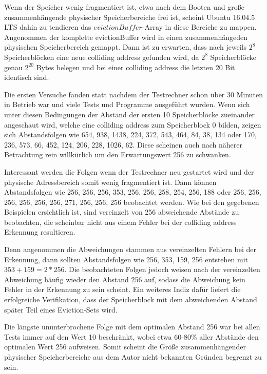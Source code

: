 Wenn der Speicher wenig fragmentiert ist, etwa nach dem Booten und große zusammenhängende physischer Speicherbereiche frei ist, scheint Ubuntu 16.04.5 LTS dahin zu tendieren das $evictionBuffer$-Array in diese Bereiche zu mappen.
Angenommen der komplette evictionBuffer wird in einen zusammenhängeden physischen Speicherbereich gemappt. Dann ist zu erwarten, dass nach jeweils $2^8$ Speicherblöcken eine neue colliding address gefunden wird, da $2^8$ Speicherblöcke genau $2^20$ Bytes belegen und bei einer colliding address die letzten 20 Bit identisch sind.

Die ersten Versuche fanden statt nachdem der Testrechner schon über 30 Minuten in Betrieb war und viele Tests und Programme ausgeführt wurden.
Wenn sich unter diesen Bedingungen der Abstand der ersten 10 Speicherblöcke zueinander angeschaut wird, welche eine colliding address zum Speicherblock 0 bilden, zeigen sich Abstandsfolgen wie 654, 938, 1438, 224, 372, 543, 464, 84, 38, 134 oder 170, 236, 573, 66, 452, 124, 206, 228, 1026, 62.
Diese scheinen auch nach näherer Betrachtung rein willkürlich um den Erwartungswert 256 zu schwanken.

Interessant werden die Folgen wenn der Testrechner neu gestartet wird und der physische Adressbereich somit wenig fragmentiert ist.
Dann können Abstandsfolgen wie 256, 256, 256, 353, 256, 256, 258, 254, 256, 188 oder 256, 256, 256, 256, 256, 256, 271, 256, 256, 256 beobachtet werden.
Wie bei den gegebenen Beispielen ersichtlich ist, sind vereinzelt von 256 abweichende Abstände zu beobachten, die scheinbar nicht aus einem Fehler bei der colliding address Erkennung resultieren.

Denn angenommen die Abweichungen stammen aus vereinzelten Fehlern bei der Erkennung, dann sollten Abstandsfolgen wie 256, 353, 159, 256 entstehen mit $353+159=2*256$.
Die beobachteten Folgen jedoch weisen nach der vereinzelten Abweichung häufig wieder den Abstand 256 auf, sodass die Abweichung kein Fehler in der Erkennung zu sein scheint.
Ein weiteres Indiz dafür liefert die erfolgreiche Verifikation, dass der Speicherblock mit dem abweichenden Abstand später Teil eines Eviction-Sets wird.

Die längste ununterbrochene Folge mit dem optimalen Abstand 256 war bei allen Tests immer auf den Wert 10 beschränkt, wobei etwa 60-80\% aller Abstände den optimalen Wert 256 aufweisen.
Somit scheint die Größe zusammenhängender physischer Speicherbereiche aus dem Autor nicht bekannten Gründen begrenzt zu sein.